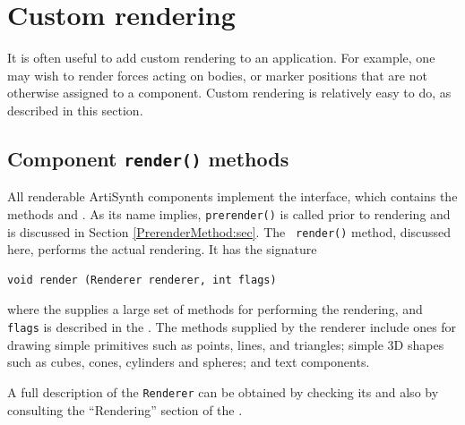 \section{Custom rendering}

It is often useful to add custom rendering to an application.  For
example, one may wish to render forces acting on bodies, or marker
positions that are not otherwise assigned to a component.  Custom
rendering is relatively easy to do, as described in this section.

\subsection{Component {\tt render()} methods}
\label{RenderMethods:sec}

All renderable ArtiSynth components implement
the  interface, which
contains the methods
 and
.
As its name implies, {\tt prerender()} is called prior to rendering
and is discussed in Section \ref{PrerenderMethod:sec}.  The {\tt
render()} method, discussed here, performs the actual rendering. It
has the signature
%
\begin{lstlisting}[]
  void render (Renderer renderer, int flags)
\end{lstlisting}
%
where the
supplies a large set of methods for performing the rendering, and {\tt
flags} is described in the
.
The methods supplied by the renderer include ones for drawing simple
primitives such as points, lines, and triangles; simple 3D shapes such
as cubes, cones, cylinders and spheres; and text components.

\begin{sideblock}
A full description of the {\tt Renderer} can be obtained
by checking its 
and also by consulting the ``Rendering'' section of the
.
\end{sideblock}

